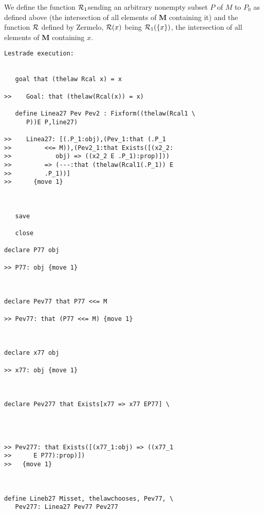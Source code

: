 \documentclass[12pt]{article}
\begin{document}
We define the function ${\cal R}_1$sending an arbitrary nonempty subset $P$ of $M$ to $P_0$ as defined above (the intersection of all elements of {\bf M} containing it)
and the function $\cal R$ defined by Zermelo, ${\cal R}(x)$ being ${\cal R}_1(\{x\})$, the intersection of all elements of {\bf M} containing $x$.

\begin{verbatim}Lestrade execution:


   goal that (thelaw Rcal x) = x

>>    Goal: that (thelaw(Rcal(x)) = x)

   define Linea27 Pev Pev2 : Fixform((thelaw(Rcal1 \
      P))E P,line27)

>>    Linea27: [(.P_1:obj),(Pev_1:that (.P_1
>>         <<= M)),(Pev2_1:that Exists([(x2_2:
>>            obj) => ((x2_2 E .P_1):prop)]))
>>         => (---:that (thelaw(Rcal1(.P_1)) E
>>         .P_1))]
>>      {move 1}



   save

   close

declare P77 obj

>> P77: obj {move 1}



declare Pev77 that P77 <<= M

>> Pev77: that (P77 <<= M) {move 1}



declare x77 obj

>> x77: obj {move 1}



declare Pev277 that Exists[x77 => x77 EP77] \
   



>> Pev277: that Exists([(x77_1:obj) => ((x77_1
>>      E P77):prop)])
>>   {move 1}



define Lineb27 Misset, thelawchooses, Pev77, \
   Pev277: Linea27 Pev77 Pev277


\end{verbatim}
\end{document}
